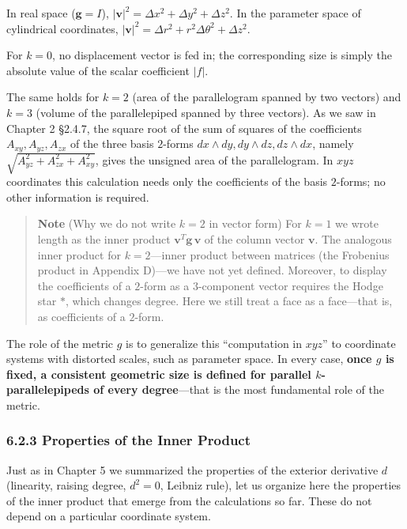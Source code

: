 In real space (\(\mathbf{g}=I\)),
\(|\mathbf{v}|^2 = \Delta x^2 + \Delta y^2 + \Delta z^2\). In the
parameter space of cylindrical coordinates,
\(|\mathbf{v}|^2 = \Delta r^2 + r^2\Delta\theta^2 + \Delta z^2\).

For \(k=0\), no displacement vector is fed in; the corresponding size is
simply the absolute value of the scalar coefficient \(|f|\).

The same holds for \(k=2\) (area of the parallelogram spanned by two
vectors) and \(k=3\) (volume of the parallelepiped spanned by three
vectors). As we saw in Chapter 2 §2.4.7, the square root of the sum of
squares of the coefficients \(A_{xy}, A_{yz}, A_{zx}\) of the three
basis \(2\)-forms \(dx \wedge dy, dy \wedge dz, dz \wedge dx\), namely
\(\sqrt{A_{yz}^2 + A_{zx}^2 + A_{xy}^2}\), gives the unsigned area of
the parallelogram. In \(xyz\) coordinates this calculation needs only
the coefficients of the basis \(2\)-forms; no other information is
required.

\begin{quote}
\textbf{Note} (Why we do not write \(k=2\) in vector form) For \(k=1\)
we wrote length as the inner product
\(\mathbf{v}^T\mathbf{g}\,\mathbf{v}\) of the column vector
\(\mathbf{v}\). The analogous inner product for \(k=2\)---inner product
between matrices (the Frobenius product in Appendix D)---we have not yet
defined. Moreover, to display the coefficients of a \(2\)-form as a
\(3\)-component vector requires the Hodge star \(\ast\), which changes
degree. Here we still treat a face as a face---that is, as coefficients
of a \(2\)-form.
\end{quote}

The role of the metric \(g\) is to generalize this ``computation in
\(xyz\)'' to coordinate systems with distorted scales, such as parameter
space. In every case,
\textbf{once $g$ is fixed, a consistent geometric size is defined for parallel $k$-parallelepipeds of every degree}---that
is the most fundamental role of the metric.

\hypertarget{properties-of-the-inner-product}{%
\subsubsection{6.2.3 Properties of the Inner
Product}\label{properties-of-the-inner-product}}

Just as in Chapter 5 we summarized the properties of the exterior
derivative \(d\) (linearity, raising degree, \(d^2=0\), Leibniz rule),
let us organize here the properties of the inner product that emerge
from the calculations so far. These do not depend on a particular
coordinate system.

